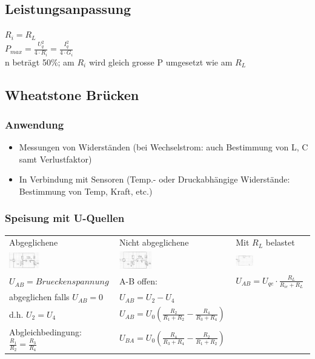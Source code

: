\subsection{Leistungsanpassung}
$R_i = R_L$ \\
$P_{max} = \frac{U_q^2}{4 \cdot R_i} = \frac{I_q^2}{4 \cdot G_i}$\\
n beträgt 50\%; am $R_i$ wird gleich grosse P umgesetzt wie am $R_L$\\

\subsection{Wheatstone Brücken}
\subsubsection{Anwendung}
\begin{itemize}
\item Messungen von Widerständen (bei Wechselstrom: auch Bestimmung von L, C samt Verlustfaktor)
\item In Verbindung mit Sensoren (Temp.- oder Druckabhängige Widerstände: Bestimmung von Temp, Kraft, etc.)
\end{itemize}
\subsubsection{Speisung mit U-Quellen}
\begin{tabular}{lll}
Abgeglichene & Nicht abgeglichene & Mit $R_L$ belastet \\
\includegraphics[width=0.3\textwidth]{pics/wheatstone/u_quelle_abgeglichen} & \includegraphics[width=0.3\textwidth]{pics/wheatstone/u_quelle_nicht_abgeglichen} & 
\includegraphics[width=0.25\textwidth]{pics/wheatstone/belastet} \\
$U_{AB} = Brueckenspannung$ & A-B offen: & $U_{AB} = U_{qe} \cdot
\frac{R_L}{R_{ie} + R_L}$ \\ abgeglichen falls $U_{AB} = 0$ & $U_{AB} = U_2 - U_4$ & \\
d.h. $ U_2 = U_4 $ & $U_{AB} = U_0(\frac{R_2}{R_1 + R_2} - \frac{R_4}{R_3 + R_4})$ & \\
Abgleichbedingung: $ \frac{R_1}{R_2} = \frac{R_3}{R_4 } $ &  $ U_{BA} = U_0(\frac{R_4}{R_3+R_4} - \frac{R_2}{R_1+R_2})$& \\
\end{tabular}


